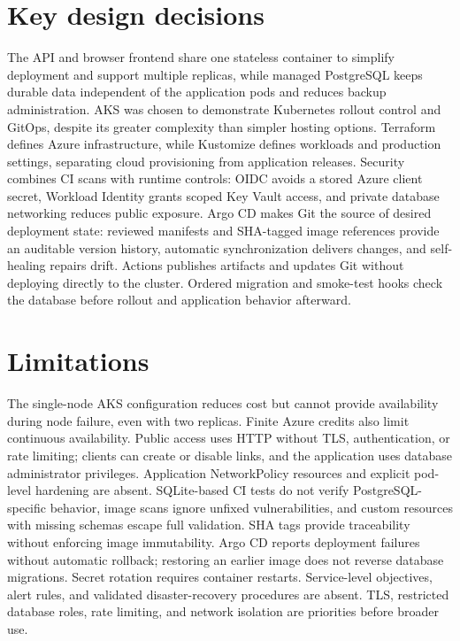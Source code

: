 \documentclass[10pt,a4paper]{article}
\begin{document}
\section{Key design decisions}
The API and browser frontend share one stateless container to simplify deployment and support multiple replicas, while managed PostgreSQL keeps durable data independent of the application pods and reduces backup administration. AKS was chosen to demonstrate Kubernetes rollout control and GitOps, despite its greater complexity than simpler hosting options. Terraform defines Azure infrastructure, while Kustomize defines workloads and production settings, separating cloud provisioning from application releases. Security combines CI scans with runtime controls: OIDC avoids a stored Azure client secret, Workload Identity grants scoped Key Vault access, and private database networking reduces public exposure. Argo CD makes Git the source of desired deployment state: reviewed manifests and SHA-tagged image references provide an auditable version history, automatic synchronization delivers changes, and self-healing repairs drift. Actions publishes artifacts and updates Git without deploying directly to the cluster. Ordered migration and smoke-test hooks check the database before rollout and application behavior afterward.

\section{Limitations}
The single-node AKS configuration reduces cost but cannot provide availability during node failure, even with two replicas. Finite Azure credits also limit continuous availability. Public access uses HTTP without TLS, authentication, or rate limiting; clients can create or disable links, and the application uses database administrator privileges. Application NetworkPolicy resources and explicit pod-level hardening are absent. SQLite-based CI tests do not verify PostgreSQL-specific behavior, image scans ignore unfixed vulnerabilities, and custom resources with missing schemas escape full validation. SHA tags provide traceability without enforcing image immutability. Argo CD reports deployment failures without automatic rollback; restoring an earlier image does not reverse database migrations. Secret rotation requires container restarts. Service-level objectives, alert rules, and validated disaster-recovery procedures are absent. TLS, restricted database roles, rate limiting, and network isolation are priorities before broader use.
\end{document}
